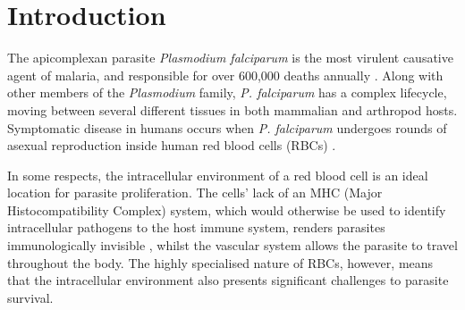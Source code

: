 \documentclass[fleqn,10pt]{SelfArx} %
\begin{document}
\flushbottom %

\maketitle %

\tableofcontents %

\thispagestyle{empty} %


\newcommand{\bn}
[1]{\textit{#1}}

\newcommand{\pf}
{\bn{P. falciparum }}

\newcommand{\str}
[1]{\textbf{#1}}

\section{Introduction} 

The apicomplexan parasite \bn{Plasmodium falciparum} is the most virulent causative agent of malaria, and responsible for over 600,000 deaths annually \cite{WorldHealthOrganisation2013}. Along with other members of the \bn{Plasmodium} family, \pf has a complex lifecycle, moving between several different tissues in both mammalian and arthropod hosts. Symptomatic disease in humans occurs when \pf undergoes rounds of asexual reproduction inside human red blood cells (RBCs) \cite{Chen2000}.

In some respects, the intracellular environment of a red blood cell is an ideal location for parasite proliferation. The cells' lack of an MHC (Major Histocompatibility Complex) system, which would otherwise be used to identify intracellular pathogens to the host immune system, renders parasites immunologically invisible \cite{Kirchgatter2005}, whilst the vascular system allows the parasite to travel throughout the body. The highly specialised nature of RBCs, however, means that the intracellular environment also presents significant challenges to parasite survival.
\end{document}
